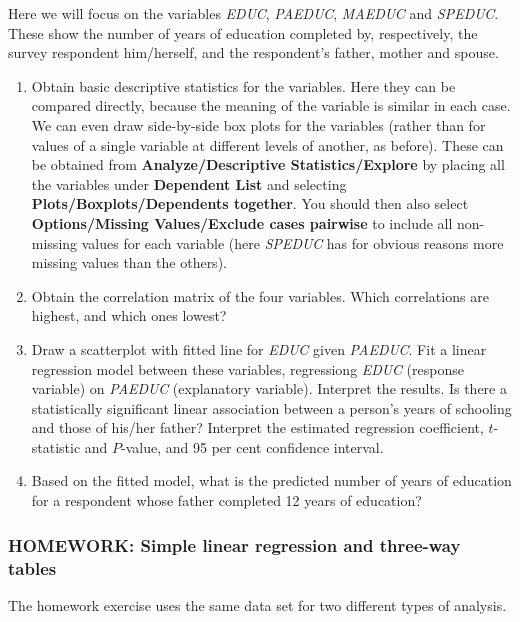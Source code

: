 Here we will focus on the variables
\emph{EDUC}, \emph{PAEDUC}, \emph{MAEDUC} and \emph{SPEDUC}. These
show the number of years of education completed by, respectively, the
survey respondent him/herself, and the respondent's father, mother and
spouse.
\begin{enumerate}
\vspace*{-1ex}
\item
Obtain basic descriptive statistics for the variables.
Here they can be compared directly, because the meaning of the variable
is similar in each case. We can even draw side-by-side box plots
for the variables (rather than for values of a single variable at
different levels of another, as before). These can be obtained from
\textbf{Analyze/Descriptive Statistics/Explore} by placing all the
variables under \textbf{Dependent List} and selecting
\textbf{Plots/Boxplots/Dependents together}. You should then also select
\textbf{Options/Missing Values/Exclude cases pairwise} to include all
non-missing values for each variable (here \emph{SPEDUC} has for obvious
reasons more missing values than the others).
\item
Obtain the correlation matrix of the four variables. Which
correlations are highest, and which ones lowest?
\item
Draw a scatterplot with fitted line
for \emph{EDUC} given \emph{PAEDUC}.
Fit a linear regression
model between these variables, regressiong \emph{EDUC} (response variable)
on \emph{PAEDUC} (explanatory variable).
Interpret the results. Is there a statistically significant linear association between
a person's years of schooling and those of his/her father? Interpret the estimated
regression coefficient, $t$-statistic and
$P$-value, and 95 per cent confidence interval.
\item
Based on
the fitted model, what is the predicted number of years of education for
a respondent whose father completed 12 years of education?
\end{enumerate}

\subsubsection{HOMEWORK: Simple linear regression and three-way tables}

The homework exercise uses the same data set for two different types of
analysis.

